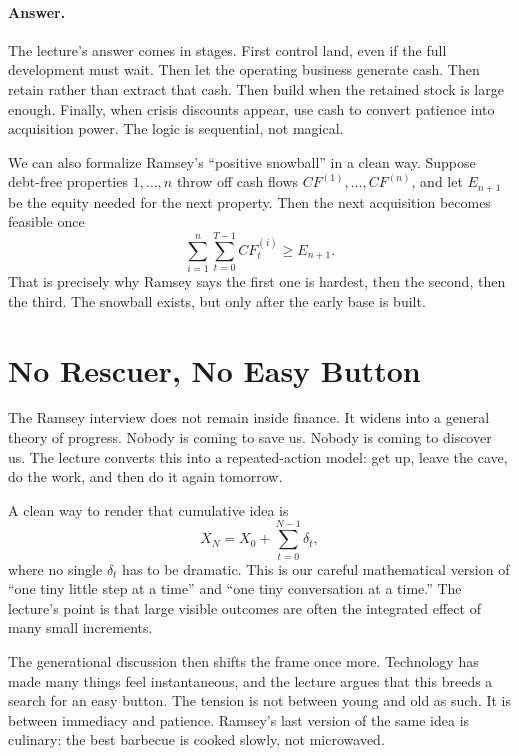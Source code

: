 \paragraph{Answer.} The lecture's answer comes in stages. First control land, even if the full development must wait. Then let the operating business generate cash. Then retain rather than extract that cash. Then build when the retained stock is large enough. Finally, when crisis discounts appear, use cash to convert patience into acquisition power. The logic is sequential, not magical.

We can also formalize Ramsey's ``positive snowball'' in a clean way. Suppose debt-free properties \(1,\dots,n\) throw off cash flows \(CF^{(1)},\dots,CF^{(n)}\), and let \(E_{n+1}\) be the equity needed for the next property. Then the next acquisition becomes feasible once
\begin{equation}
\sum_{i=1}^{n}\sum_{t=0}^{T-1} CF_t^{(i)} \ge E_{n+1}.
\end{equation}
That is precisely why Ramsey says the first one is hardest, then the second, then the third. The snowball exists, but only after the early base is built.

\section{No Rescuer, No Easy Button}

The Ramsey interview does not remain inside finance. It widens into a general theory of progress. Nobody is coming to save us. Nobody is coming to discover us. The lecture converts this into a repeated-action model: get up, leave the cave, do the work, and then do it again tomorrow.

A clean way to render that cumulative idea is
\begin{equation}
X_N = X_0 + \sum_{t=0}^{N-1}\delta_t,
\end{equation}
where no single \(\delta_t\) has to be dramatic. This is our careful mathematical version of ``one tiny little step at a time'' and ``one tiny conversation at a time.'' The lecture's point is that large visible outcomes are often the integrated effect of many small increments.

The generational discussion then shifts the frame once more. Technology has made many things feel instantaneous, and the lecture argues that this breeds a search for an easy button. The tension is not between young and old as such. It is between immediacy and patience. Ramsey's last version of the same idea is culinary: the best barbecue is cooked slowly, not microwaved.

